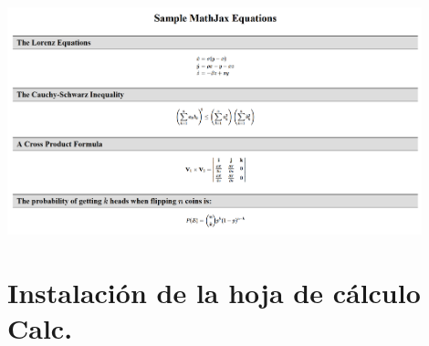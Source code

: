\documentclass[10pt,a4paper]{article}\usepackage[]{graphicx}\usepackage[]{color}
\begin{document}
    \begin{center}
    \includegraphics[width=12cm]{../fig/Tut00-18-MathJaxTest.png}
    \end{center}



\section{Instalación de la hoja de cálculo Calc.}
\label{tut00:sec:InstalacionCalc}
\end{document}
